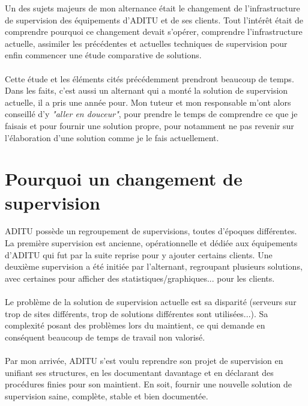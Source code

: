 \renewcommand{\figurename}{}

Un des sujets majeurs de mon alternance était le changement de l'infrastructure de supervision des équipements d'ADITU et de ses clients. Tout l'intérêt était de comprendre pourquoi ce changement devait s'opérer, comprendre l'infrastructure actuelle, assimiler les précédentes et actuelles techniques de supervision pour enfin commencer une étude comparative de solutions.
\\ \\
Cette étude et les éléments cités précédemment prendront beaucoup de temps. Dans les faits, c'est aussi un alternant qui a monté la solution de supervision actuelle, il a pris une année pour. Mon tuteur et mon responsable m'ont alors conseillé d'y \textit{"aller en douceur"}, pour prendre le temps de comprendre ce que je faisais et pour fournir une solution propre, pour notamment ne pas revenir sur l'élaboration d'une solution comme je le fais actuellement.

\section{Pourquoi un changement de supervision}

ADITU possède un regroupement de supervisions, toutes d'époques différentes. La première supervision est ancienne, opérationnelle et dédiée aux équipements d'ADITU qui fut par la suite reprise pour y ajouter certains clients. Une deuxième supervision a été initiée par l'alternant, regroupant plusieurs solutions, avec certaines pour afficher des statistiques/graphiques... pour les clients.
\\ \\
Le problème de la solution de supervision actuelle est sa disparité (serveurs sur trop de sites différents, trop de solutions différentes sont utilisées...). Sa complexité posant des problèmes lors du maintient, ce qui demande en conséquent beaucoup de temps de travail non valorisé.
\\ \\
Par mon arrivée, ADITU s'est voulu reprendre son projet de supervision en unifiant ses structures, en les documentant davantage et en déclarant des procédures finies pour son maintient. En soit, fournir une nouvelle solution de supervision saine, complète, stable et bien documentée.

